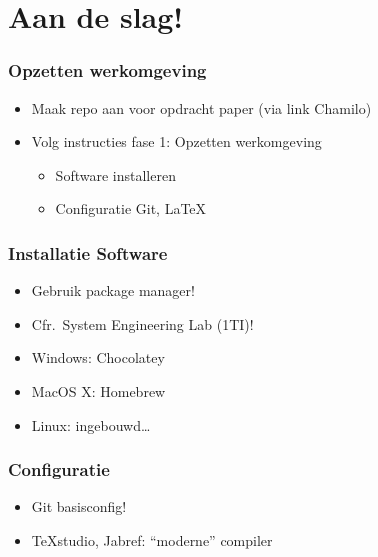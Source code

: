 \documentclass[aspectratio=169]{beamer}
\begin{document}
\section{Aan de slag!}

\begin{frame}
  \frametitle{Opzetten werkomgeving}

  \begin{itemize}
    \item Maak repo aan voor opdracht paper (via link Chamilo)
    \item Volg instructies fase 1: Opzetten werkomgeving
      \begin{itemize}
        \item Software installeren
        \item Configuratie Git, LaTeX
      \end{itemize}
  \end{itemize}

\end{frame}

\begin{frame}
  \frametitle{Installatie Software}

  \begin{itemize}
    \item Gebruik package manager!
    \item Cfr.\ System Engineering Lab (1TI)!
    \item Windows: Chocolatey
    \item MacOS X: Homebrew
    \item Linux: ingebouwd\ldots
  \end{itemize}

\end{frame}

\begin{frame}
  \frametitle{Configuratie}

  \begin{itemize}
    \item Git basisconfig!
    \item {\TeX}studio, Jabref: ``moderne'' compiler
  \end{itemize}
\end{frame}
\end{document}
